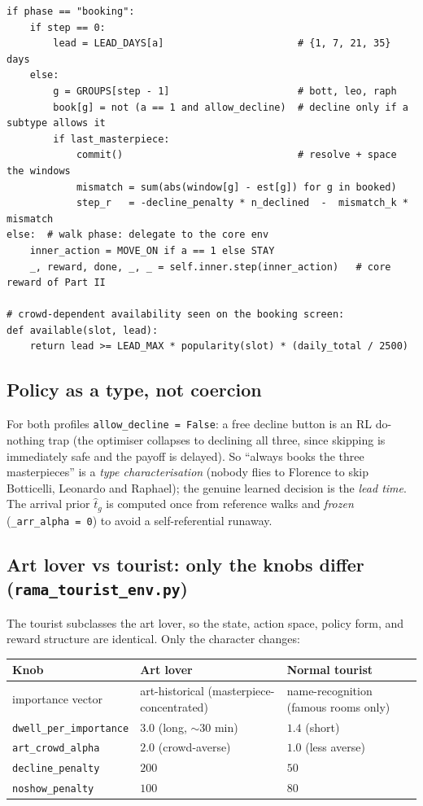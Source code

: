 \documentclass[11pt]{article}
\newcommand{\file}[1]{\texttt{\small #1}}
\newcommand{\co}[1]{\texttt{\small #1}}
\begin{document}
\begin{lstlisting}
if phase == "booking":
    if step == 0:
        lead = LEAD_DAYS[a]                       # {1, 7, 21, 35} days
    else:
        g = GROUPS[step - 1]                      # bott, leo, raph
        book[g] = not (a == 1 and allow_decline)  # decline only if a subtype allows it
        if last_masterpiece:
            commit()                              # resolve + space the windows
            mismatch = sum(abs(window[g] - est[g]) for g in booked)
            step_r   = -decline_penalty * n_declined  -  mismatch_k * mismatch
else:  # walk phase: delegate to the core env
    inner_action = MOVE_ON if a == 1 else STAY
    _, reward, done, _, _ = self.inner.step(inner_action)   # core reward of Part II

# crowd-dependent availability seen on the booking screen:
def available(slot, lead):
    return lead >= LEAD_MAX * popularity(slot) * (daily_total / 2500)
\end{lstlisting}

\subsection{Policy as a type, not coercion}

For both profiles \co{allow\_decline = False}: a free decline button is an RL do-nothing
trap (the optimiser collapses to declining all three, since skipping is immediately safe
and the payoff is delayed). So ``always books the three masterpieces'' is a \emph{type
characterisation} (nobody flies to Florence to skip Botticelli, Leonardo and Raphael);
the genuine learned decision is the \emph{lead time}. The arrival prior $\hat t_g$ is
computed once from reference walks and \emph{frozen} (\co{\_arr\_alpha = 0}) to avoid a
self-referential runaway.

\subsection{Art lover vs tourist: only the knobs differ (\file{rama\_tourist\_env.py})}

The tourist subclasses the art lover, so the state, action space, policy form, and reward
structure are identical. Only the character changes:

\begin{center}
\renewcommand{\arraystretch}{1.2}
\footnotesize
\begin{tabular}{@{}l l l@{}}
\toprule
\textbf{Knob} & \textbf{Art lover} & \textbf{Normal tourist} \\
\midrule
importance vector       & art-historical (masterpiece-concentrated) & name-recognition (famous rooms only) \\
\co{dwell\_per\_importance} & $3.0$ (long, $\sim$30 min) & $1.4$ (short) \\
\co{art\_crowd\_alpha}      & $2.0$ (crowd-averse) & $1.0$ (less averse) \\
\co{decline\_penalty}       & $200$ & $50$ \\
\co{noshow\_penalty}        & $100$ & $80$ \\
\bottomrule
\end{tabular}
\end{center}
\end{document}
